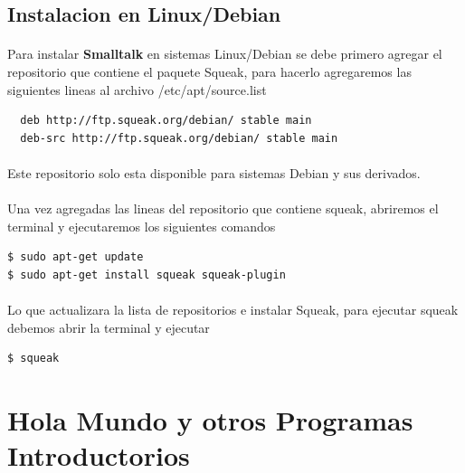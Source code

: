 \documentclass[11pt]{article}
\begin{document}
\subsection{\textbf{Instalacion en Linux/Debian}}
\paragraph{} \noindent
Para instalar \textbf{Smalltalk} en sistemas Linux/Debian se debe primero agregar el repositorio que contiene el paquete Squeak, para hacerlo agregaremos las siguientes lineas al archivo  /etc/apt/source.list

\begin{lstlisting}
  deb http://ftp.squeak.org/debian/ stable main
  deb-src http://ftp.squeak.org/debian/ stable main
\end{lstlisting}
\paragraph{} \noindent
Este repositorio solo esta disponible para sistemas Debian y sus derivados.
\paragraph{} \noindent
Una vez agregadas las lineas del repositorio que contiene squeak, abriremos el terminal y ejecutaremos los siguientes comandos
\begin{lstlisting}
$ sudo apt-get update
$ sudo apt-get install squeak squeak-plugin
\end{lstlisting}
\paragraph{} \noindent
Lo que actualizara la lista de repositorios e instalar Squeak, para ejecutar squeak debemos abrir la terminal y ejecutar
\begin{lstlisting}
$ squeak
\end{lstlisting}
\section{\textbf{Hola Mundo y otros Programas Introductorios}}
\end{document}
